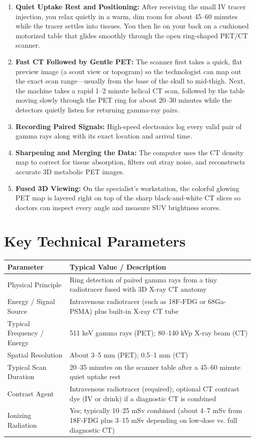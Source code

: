 \begin{enumerate}
    \item \textbf{Quiet Uptake Rest and Positioning:} After receiving the small IV tracer injection, you relax quietly in a warm, dim room for about 45--60 minutes while the tracer settles into tissues. You then lie on your back on a cushioned motorized table that glides smoothly through the open ring-shaped PET/CT scanner.
    \item \textbf{Fast CT Followed by Gentle PET:} The scanner first takes a quick, flat preview image (a scout view or topogram) so the technologist can map out the exact scan range---usually from the base of the skull to mid-thigh. Next, the machine takes a rapid 1--2 minute helical CT scan, followed by the table moving slowly through the PET ring for about 20--30 minutes while the detectors quietly listen for returning gamma-ray pairs.
    \item \textbf{Recording Paired Signals:} High-speed electronics log every valid pair of gamma rays along with its exact location and arrival time.
    \item \textbf{Sharpening and Merging the Data:} The computer uses the CT density map to correct for tissue absorption, filters out stray noise, and reconstructs accurate 3D metabolic PET images.
    \item \textbf{Fused 3D Viewing:} On the specialist's workstation, the colorful glowing PET map is layered right on top of the sharp black-and-white CT slices so doctors can inspect every angle and measure SUV brightness scores.
\end{enumerate}

\section{Key Technical Parameters}

\noindent
\begin{tabularx}{\textwidth}{@{}l X@{}}
\toprule
\textbf{Parameter} & \textbf{Typical Value / Description} \\
\midrule
Physical Principle & Ring detection of paired gamma rays from a tiny radiotracer fused with 3D X-ray CT anatomy \\
Energy / Signal Source & Intravenous radiotracer (such as 18F-FDG or 68Ga-PSMA) plus built-in X-ray CT tube \\
Typical Frequency / Energy & 511 keV gamma rays (PET); 80--140 kVp X-ray beam (CT) \\
Spatial Resolution & About 3--5 mm (PET); 0.5--1 mm (CT) \\
Typical Scan Duration & 20--35 minutes on the scanner table after a 45--60 minute quiet uptake rest \\
Contrast Agent & Intravenous radiotracer (required); optional CT contrast dye (IV or drink) if a diagnostic CT is combined \\
Ionizing Radiation & Yes; typically 10--25 mSv combined (about 4--7 mSv from 18F-FDG plus 3--15 mSv depending on low-dose vs. full diagnostic CT) \\
\bottomrule
\end{tabularx}

